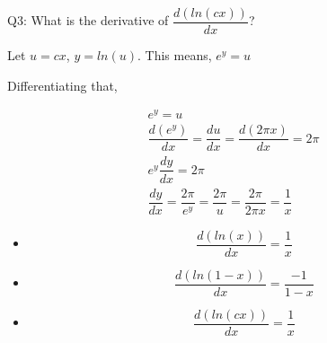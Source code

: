 \documentclass[float=false,crop=false]{standalone}
\begin{document}
    Q3: What is the derivative of \(\dfrac{d(ln(cx))}{dx}\)?

Let \(u=cx\), \(y = ln(u)\). This means, \(e^y = u\)

Differentiating that,

\[
\begin{aligned}
e^y = u \\
\dfrac{d(e^y)}{dx} = \dfrac{du}{dx} = \dfrac{d(2\pi x)}{dx} = 2\pi \\
e^y\dfrac{dy}{dx} = 2\pi \\
\dfrac{dy}{dx} = \dfrac{2\pi}{e^y} = \dfrac{2\pi}{u} = \dfrac{2\pi}{2\pi x} = \dfrac{1}{x}
\end{aligned}
\]
\begin{tcolorbox}[colback=green!5,colframe=green!40!black,title=Derivatives of $ln$]
\begin{itemize}
\item 
\begin{equation}
    \dfrac{d(ln(x))}{dx} = \dfrac{1}{x} \label{eq:MA06}
\end{equation}
\item 
\begin{equation}
    \dfrac{d(ln(1-x))}{dx} = \dfrac{-1}{1 - x} \label{eq:MA07}
\end{equation}
\item 
\begin{equation}
    \dfrac{d(ln(cx))}{dx} = \dfrac{1}{x} \label{eq:MA08}
\end{equation}
\end{itemize}
\end{tcolorbox}

    
    
    
    
\end{document}
